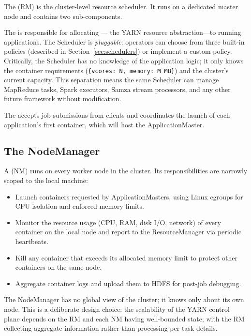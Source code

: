 The  (RM) is the cluster-level resource scheduler.
It runs on a dedicated master node and contains two sub-components.

The  is responsible for allocating ---
the YARN resource abstraction---to running applications. The Scheduler
is \emph{pluggable}: operators can choose from three built-in policies
(described in Section~\ref{sec:schedulers}) or implement a custom policy.
Critically, the Scheduler has no knowledge of the application logic; it
only knows the container requirements (\texttt{\{vcores: N, memory:
M~MB\}}) and the cluster's current capacity. This separation means the
same Scheduler can manage MapReduce tasks, Spark executors, Samza stream
processors, and any other future framework without modification.

The  accepts job submissions from clients and
coordinates the launch of each application's first container, which will
host the ApplicationMaster.

\subsection{The NodeManager}
\label{subsec:nm}

A  (NM) runs on every worker node in the cluster.
Its responsibilities are narrowly scoped to the local machine:
\begin{itemize}
  \item Launch containers requested by ApplicationMasters, using Linux
        cgroups for CPU isolation and enforced memory limits.
  \item Monitor the resource usage (CPU, RAM, disk I/O, network) of
        every container on the local node and report to the ResourceManager
        via periodic heartbeats.
  \item Kill any container that exceeds its allocated memory limit to
        protect other containers on the same node.
  \item Aggregate container logs and upload them to HDFS for post-job
        debugging.
\end{itemize}

The NodeManager has no global view of the cluster; it knows only about
its own node. This is a deliberate design choice: the scalability of the
YARN control plane depends on the RM and each NM having well-bounded
state, with the RM collecting aggregate information rather than
processing per-task details.


